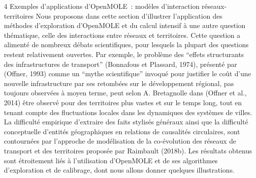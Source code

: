 \documentclass[10pt]{article}
\begin{document}
4 Exemples d’applications d’OpenMOLE : modèles d’interaction réseaux-territoires
Nous proposons dans cette section d’illustrer l’application des méthodes d’exploration d’OpenMOLE et du calcul intensif à une autre question thématique, celle des interactions entre réseaux et territoires. Cette question a alimenté de nombreux débats scientifiques, pour lesquels la plupart des questions restent relativement ouvertes. Par exemple, le problème des “effets structurants des infrastructures de transport” (Bonnafous et Plassard, 1974), présenté par (Offner, 1993) comme un “mythe scientifique” invoqué pour justifier le coût d’une nouvelle infrastructure par ses retombées sur le développement régional, pas toujours observées à moyen terme, peut selon A. Bretagnolle dans (Offner et al., 2014) être observé pour des territoires plus vastes et sur le temps long, tout en tenant compte des fluctuations locales dans les  dynamiques des systèmes de villes. La difficulté empirique d’extraire des faits stylisés généraux ainsi que la difficulté conceptuelle d'entités géographiques en relations de causalités circulaires, sont contournées par l’approche de modélisation de la co-évolution des réseaux de transport et des territoires proposée par Raimbault (2018b). Les résultats obtenus sont étroitement liés à l’utilisation d’OpenMOLE et de ses algorithmes d’exploration et de calibrage, dont nous allons donner quelques illustrations.
\end{document}

